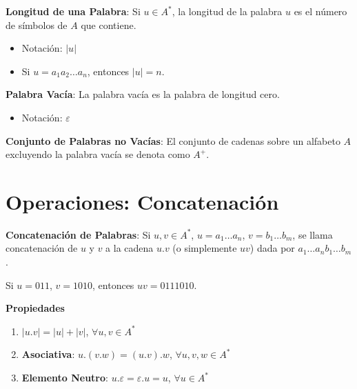 \documentclass[12pt]{report} %
\providecommand{\tightlist}{%
  \setlength{\itemsep}{0pt}\setlength{\parskip}{0pt}}
\begin{document}
\begin{definicion}
\textbf{Longitud de una Palabra}: Si $u \in A^*$, la longitud de la palabra $u$ es el número de símbolos de $A$ que contiene.  
\begin{itemize}
    \item Notación: $\lvert u \rvert$  
    \item Si $u = a_1 a_2 \ldots a_n$, entonces $\lvert u \rvert = n$.  
\end{itemize}
\end{definicion}

\begin{definicion}
\textbf{Palabra Vacía}: La palabra vacía es la palabra de longitud cero.  
\begin{itemize}
    \item Notación: $\varepsilon$  
\end{itemize}
\end{definicion}

\begin{definicion}
\textbf{Conjunto de Palabras no Vacías}: El conjunto de cadenas sobre un alfabeto $A$ excluyendo la palabra vacía se denota como $A^+$.  
\end{definicion}

\hypertarget{operaciones-concatenaciuxf3n}{%
\section{Operaciones:
Concatenación}\label{operaciones-concatenaciuxf3n}}

\begin{definicion}
\textbf{Concatenación de Palabras}: Si $u, v \in A^*$, $u = a_1 \ldots a_n$, $v = b_1 \ldots b_m$, se llama concatenación de $u$ y $v$ a la cadena $u.v$ (o simplemente $uv$) dada por $a_1 \ldots a_n b_1 \ldots b_m$.
\end{definicion}

\begin{ejemplo}
Si $u = 011$, $v = 1010$, entonces $uv = 0111010$.
\end{ejemplo}

\textbf{Propiedades}

\begin{enumerate}
\def\labelenumi{\arabic{enumi}.}
\tightlist
\item
  \(\lvert u.v \rvert = \lvert u \rvert + \lvert v \rvert\),
  \(\forall u, v \in A^*\)\\
\item
  \textbf{Asociativa}: \(u.(v.w) = (u.v).w\),
  \(\forall u, v, w \in A^*\)\\
\item
  \textbf{Elemento Neutro}: \(u.\varepsilon = \varepsilon.u = u\),
  \(\forall u \in A^*\)
\end{enumerate}
\end{document}
